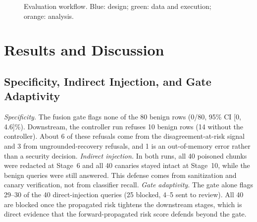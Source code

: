 \documentclass[conference]{IEEEtran}
\begin{document}
\begin{figure}[t]
\centering
{}
\caption{Evaluation workflow. Blue: design; green: data and execution; orange: analysis.}
\label{fig:workflow}
\end{figure}

\section{Results and Discussion}\label{sec:results}
\subsection{Specificity, Indirect Injection, and Gate Adaptivity}
\emph{Specificity.} The fusion gate flags none of the 80 benign rows (0/80, 95\% CI [0, 4.6]\%). Downstream, the controller run refuses 10 benign rows (14 without the controller). About 6 of these refusals come from the disagreement-at-risk signal and 3 from ungrounded-recovery refusals, and 1 is an out-of-memory error rather than a security decision.
\emph{Indirect injection.} In both runs, all 40 poisoned chunks were redacted at Stage~6 and all 40 canaries stayed intact at Stage~10, while the benign queries were still answered. This defense comes from sanitization and canary verification, not from classifier recall.
\emph{Gate adaptivity.} The gate alone flags 29--30 of the 40 direct-injection queries (25 blocked, 4--5 sent to review). All 40 are blocked once the propagated risk tightens the downstream stages, which is direct evidence that the forward-propagated risk score defends beyond the gate.
\end{document}
